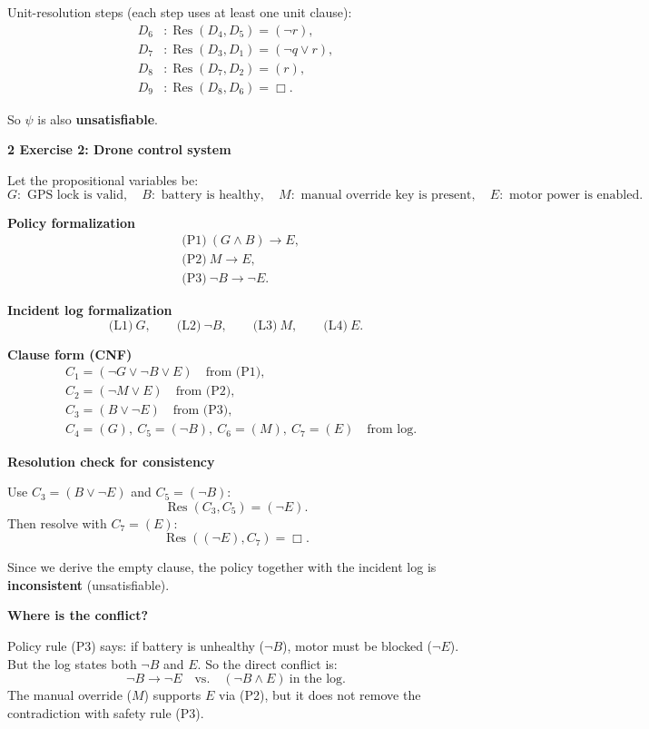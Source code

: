 \documentclass{article}
\theoremstyle{theorem}
\theoremstyle{definition}
\theoremstyle{remark}
\begin{document}
Unit-resolution steps (each step uses at least one unit clause):
\begin{align*}
D_6 &: \operatorname{Res}(D_4,D_5) = (\neg r),\\
D_7 &: \operatorname{Res}(D_3,D_1) = (\neg q \lor r),\\
D_8 &: \operatorname{Res}(D_7,D_2) = (r),\\
D_9 &: \operatorname{Res}(D_8,D_6) = \Box.
\end{align*}

So $\psi$ is also \textbf{unsatisfiable}.

\vspace{0.4cm}

\textbf{2 Exercise 2: Drone control system}

Let the propositional variables be:
\[
G:\text{ GPS lock is valid},\quad
B:\text{ battery is healthy},\quad
M:\text{ manual override key is present},\quad
E:\text{ motor power is enabled}.
\]

\textbf{Policy formalization}
\begin{align*}
&\text{(P1)}\ (G\land B)\to E,\\
&\text{(P2)}\ M\to E,\\
&\text{(P3)}\ \neg B\to \neg E.
\end{align*}

\textbf{Incident log formalization}
\[
\text{(L1)}\ G,\qquad
\text{(L2)}\ \neg B,\qquad
\text{(L3)}\ M,\qquad
\text{(L4)}\ E.
\]

\textbf{Clause form (CNF)}
\begin{align*}
&C_1=(\neg G\lor\neg B\lor E) \quad \text{from (P1)},\\
&C_2=(\neg M\lor E) \quad \text{from (P2)},\\
&C_3=(B\lor\neg E) \quad \text{from (P3)},\\
&C_4=(G),\ C_5=(\neg B),\ C_6=(M),\ C_7=(E) \quad \text{from log.}
\end{align*}

\textbf{Resolution check for consistency}

Use $C_3=(B\lor\neg E)$ and $C_5=(\neg B)$:
\[
\operatorname{Res}(C_3,C_5)=(\neg E).
\]
Then resolve with $C_7=(E)$:
\[
\operatorname{Res}((\neg E),C_7)=\Box.
\]

Since we derive the empty clause, the policy together with the incident log is \textbf{inconsistent} (unsatisfiable).

\textbf{Where is the conflict?}

Policy rule (P3) says: if battery is unhealthy ($\neg B$), motor must be blocked ($\neg E$).
But the log states both $\neg B$ and $E$.
So the direct conflict is:
\[
\neg B\to\neg E \quad \text{vs.} \quad (\neg B \land E)\ \text{in the log.}
\]
The manual override ($M$) supports $E$ via (P2), but it does not remove the contradiction with safety rule (P3).
\end{document}

